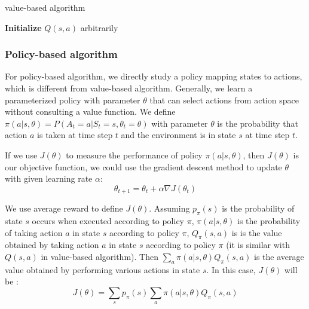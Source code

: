 \begin{algorithm}
    \caption{value-based algorithm}
    \LinesNumbered
    \textbf{Initialize}{
        $Q(s,a)$ arbitrarily
    } \\
\end{algorithm}


\subsubsection{Policy-based algorithm}

For policy-based algorithm, we directly study a policy mapping states to actions, which is different from value-based algorithm. Generally, we learn a parameterized policy with parameter $\theta$ that can select actions from action space without consulting a value function. We define $\pi (a|s,\theta)=P(A_t=a|S_t=s,\theta _t=\theta)$ with parameter $\theta$ is the probability that action $a$ is taken at time step $t$ and the environment is in state $s$ at time step $t$.

If we use $J(\theta)$ to measure the performance of policy $\pi (a|s,\theta)$, then $J(\theta)$ is our objective function, we could use the gradient descent method to update $\theta$ with given learning rate $\alpha$:
$$
\theta_{t+1}=\theta_t+\alpha \nabla J(\theta_t)
$$

We use average reward to define $J(\theta)$. Assuming $p_\pi(s)$ is the probability of state $s$ occurs when executed according to policy $\pi$, $\pi(a|s,\theta)$ is the probability of taking action $a$ in state $s$ according to policy $\pi$, $Q_\pi (s,a)$ is is the value obtained by taking action $a$ in state $s$ according to policy $\pi$ (it is similar with $Q(s,a)$ in value-based algorithm). Then $\sum_a \pi(a|s,\theta)Q_\pi(s,a)$ is the average value obtained by performing various actions in state $s$. In this case, $J(\theta)$ will be :
$$
J(\theta)=\sum_s p_\pi(s) \sum_a \pi(a|s,\theta)Q_\pi(s,a)
$$

